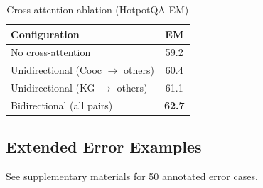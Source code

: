 \documentclass[10pt,twocolumn]{article}
\begin{document}
\begin{table}[h]
\centering
\caption{Cross-attention ablation (HotpotQA EM)}
\small
\begin{tabular}{@{}lc@{}}
\toprule
\textbf{Configuration} & \textbf{EM} \\
\midrule
No cross-attention & 59.2 \\
Unidirectional (Cooc $\rightarrow$ others) & 60.4 \\
Unidirectional (KG $\rightarrow$ others) & 61.1 \\
Bidirectional (all pairs) & \textbf{62.7} \\
\bottomrule
\end{tabular}
\end{table}


\subsection{Extended Error Examples}
See supplementary materials for 50 annotated error cases.
\end{document}
